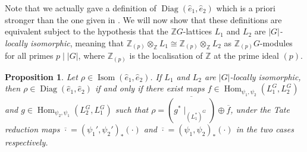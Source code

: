 \documentclass[11pt,a4paper,leqno]{amsart}
\newtheorem{proposition}[theorem]{Proposition}
\theoremstyle{definition}
\theoremstyle{remark}
\newcommand{\wh}{\widehat}
\newcommand{\Z}{\mathbb{Z}}
\newcommand{\ol}{\overline}
\DeclareMathOperator{\Hom}{Hom}
\DeclareMathOperator{\Isom}{Isom}
\DeclareMathOperator{\DiagIsom}{Diag}
\renewcommand{\L}{L}
\newcommand{\bZ}{\mathbb Z}
\begin{document}
 Note that we actually gave a definition of $\DiagIsom(\wh e_1, \wh e_2)$ which is a priori stronger than the one given in \cite[p30-31]{Kreck:1984}.
 We will  now show that these definitions are equivalent subject to the hypothesis that the $\Z G$-lattices $L_1$ and $L_2$ are \emph{$|G|$-locally isomorphic}, meaning that $\bZ_{(p)} \otimes_{\bZ} L_1 \cong \bZ_{(p)} \otimes_{\bZ} L_2$ as $\bZ_{(p)} G$-modules for all primes $p \mid |G|$, where $\bZ_{(p)}$ is the localisation of $\Z$ at the prime ideal $(p)$.


 \begin{proposition} \label{prop:diag-def-equiv} 
 Let $\rho \in \Isom(\wh e_1,\wh e_2)$. If $L_1$ and $L_2$ are $|G|$-locally isomorphic, then $\rho \in \DiagIsom(\wh e_1,\wh e_2)$ if and only if 
there exist maps $f \in \Hom_{\psi_1,\psi_2}(\L_1^G,\L_2^G)$ and $g \in \Hom_{\psi_2,\psi_1}(\L_2^G,\L_1^G)$ such that $\rho = \ol{(g^*\mid_{(\L_1^*)^G})} \oplus \ol{f}$, under the Tate reduction maps $\ol{\cdot} = (\psi_1', \psi_2')_*(\cdot)$ and $\ol{\cdot} = (\psi_1,\psi_2)_*(\cdot)$ in the two cases respectively.
\end{proposition}
\end{document}
